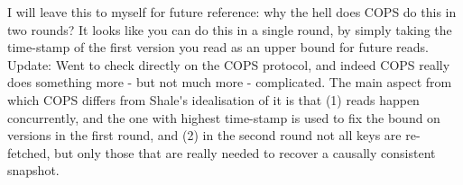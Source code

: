 \ac{I will leave this to myself for future reference: why the hell does COPS do this in two rounds? It looks like you can do 
this in a single round, by simply taking the time-stamp of the first version you read as an upper bound for future reads.
Update: Went to check directly on the COPS protocol, and indeed COPS really does something more - but not much more - complicated. 
The main aspect from which COPS differs from Shale's idealisation of it is that (1) reads happen concurrently, and the 
one with highest time-stamp is used to fix the bound on versions in the first round, and (2) in the second round not all keys 
are re-fetched, but only those that are really needed to recover a causally consistent snapshot.}



